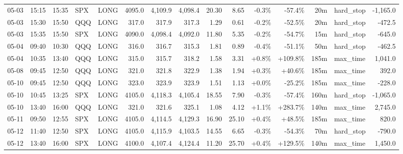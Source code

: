 \documentclass[11pt,a4paper,twoside]{article}
\begin{document}
\begin{landscape}
\begin{center}
\begin{longtable}{>{\color{txtmain}}l l l l l r r r r r r r r >{\color{txtmain}}l r}
05-03 & 15:15 & 15:35 & SPX & LONG & 4095.0 & 4,109.9 & 4,098.4 & 20.30 & 8.65 & \textcolor{lossred}{-0.3\%} & \textcolor{lossred}{-57.4\%} & 20m & hard\_stop & \textcolor{lossred}{-1,165.0} \\
05-03 & 15:30 & 15:50 & QQQ & LONG & 317.0 & 317.9 & 317.3 & 1.29 & 0.61 & \textcolor{lossred}{-0.2\%} & \textcolor{lossred}{-52.5\%} & 20m & hard\_stop & \textcolor{lossred}{-472.5} \\
05-03 & 15:35 & 15:50 & SPX & LONG & 4090.0 & 4,098.4 & 4,092.0 & 11.80 & 5.35 & \textcolor{lossred}{-0.2\%} & \textcolor{lossred}{-54.7\%} & 15m & hard\_stop & \textcolor{lossred}{-645.0} \\
05-04 & 09:40 & 10:30 & QQQ & LONG & 316.0 & 316.7 & 315.3 & 1.81 & 0.89 & \textcolor{lossred}{-0.4\%} & \textcolor{lossred}{-51.1\%} & 50m & hard\_stop & \textcolor{lossred}{-462.5} \\
05-04 & 10:35 & 13:40 & QQQ & LONG & 315.0 & 315.7 & 318.2 & 1.58 & 3.31 & \textcolor{wingreen}{+0.8\%} & \textcolor{wingreen}{+109.8\%} & 185m & max\_time & \textcolor{wingreen}{1,041.0} \\
05-08 & 09:45 & 12:50 & QQQ & LONG & 321.0 & 321.8 & 322.9 & 1.38 & 1.94 & \textcolor{wingreen}{+0.3\%} & \textcolor{wingreen}{+40.6\%} & 185m & max\_time & \textcolor{wingreen}{392.0} \\
05-10 & 09:45 & 12:50 & QQQ & LONG & 323.0 & 323.9 & 323.9 & 1.51 & 1.13 & \textcolor{wingreen}{+0.0\%} & \textcolor{lossred}{-25.2\%} & 185m & max\_time & \textcolor{lossred}{-228.0} \\
05-10 & 10:45 & 13:25 & SPX & LONG & 4105.0 & 4,118.3 & 4,105.4 & 18.55 & 7.90 & \textcolor{lossred}{-0.3\%} & \textcolor{lossred}{-57.4\%} & 160m & hard\_stop & \textcolor{lossred}{-1,065.0} \\
05-10 & 13:40 & 16:00 & QQQ & LONG & 321.0 & 321.6 & 325.1 & 1.08 & 4.12 & \textcolor{wingreen}{+1.1\%} & \textcolor{wingreen}{+283.7\%} & 140m & max\_time & \textcolor{wingreen}{2,745.0} \\
05-11 & 09:50 & 12:55 & SPX & LONG & 4105.0 & 4,114.5 & 4,129.3 & 16.90 & 25.10 & \textcolor{wingreen}{+0.4\%} & \textcolor{wingreen}{+48.5\%} & 185m & max\_time & \textcolor{wingreen}{820.0} \\
05-12 & 11:40 & 12:50 & SPX & LONG & 4105.0 & 4,115.9 & 4,103.5 & 14.55 & 6.65 & \textcolor{lossred}{-0.3\%} & \textcolor{lossred}{-54.3\%} & 70m & hard\_stop & \textcolor{lossred}{-790.0} \\
05-12 & 13:40 & 16:00 & SPX & LONG & 4100.0 & 4,107.4 & 4,124.4 & 11.20 & 25.70 & \textcolor{wingreen}{+0.4\%} & \textcolor{wingreen}{+129.5\%} & 140m & max\_time & \textcolor{wingreen}{1,450.0} \\

\end{longtable}
\end{center}
\end{landscape}
\end{document}
